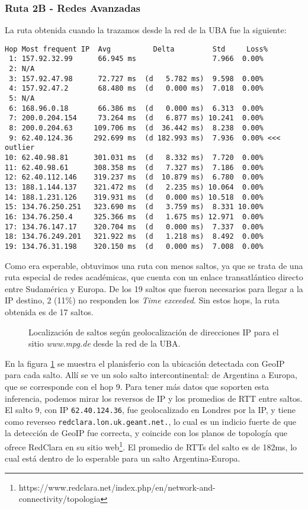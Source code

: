 \subsubsection{Ruta 2B - Redes Avanzadas}

La ruta obtenida cuando la trazamos desde la red de la UBA fue la siguiente:

\begin{Verbatim}[fontsize=\scriptsize]
Hop Most frequent IP  Avg          Delta         Std     Loss%
 1: 157.92.32.99      66.945 ms                  7.966  0.00% 
 2: N/A            
 3: 157.92.47.98      72.727 ms  (d   5.782 ms)  9.598  0.00% 
 4: 157.92.47.2       68.480 ms  (d   0.000 ms)  7.018  0.00% 
 5: N/A            
 6: 168.96.0.18       66.386 ms  (d   0.000 ms)  6.313  0.00% 
 7: 200.0.204.154     73.264 ms  (d   6.877 ms) 10.241  0.00% 
 8: 200.0.204.63     109.706 ms  (d  36.442 ms)  8.238  0.00% 
 9: 62.40.124.36     292.699 ms  (d 182.993 ms)  7.936  0.00% <<< outlier
10: 62.40.98.81      301.031 ms  (d   8.332 ms)  7.720  0.00% 
11: 62.40.98.61      308.358 ms  (d   7.327 ms)  7.186  0.00% 
12: 62.40.112.146    319.237 ms  (d  10.879 ms)  6.780  0.00% 
13: 188.1.144.137    321.472 ms  (d   2.235 ms) 10.064  0.00% 
14: 188.1.231.126    319.931 ms  (d   0.000 ms) 10.518  0.00% 
15: 134.76.250.251   323.690 ms  (d   3.759 ms)  8.331 10.00% 
16: 134.76.250.4     325.366 ms  (d   1.675 ms) 12.971  0.00% 
17: 134.76.147.17    320.704 ms  (d   0.000 ms)  7.337  0.00% 
18: 134.76.249.201   321.922 ms  (d   1.218 ms)  8.492  0.00% 
19: 134.76.31.198    320.150 ms  (d   0.000 ms)  7.008  0.00%
\end{Verbatim}

Como era esperable, obtuvimos una ruta con menos saltos, ya que se trata de una ruta especial de redes académicas, que cuenta con un enlace transatlántico directo entre Sudamérica y Europa.
De los 19 saltos que fueron necesarios para llegar a la IP destino, 2 (11\%) no responden los \emph{Time exceeded}. Sin estos hops, la ruta obtenida es de 17 saltos.

\begin{figure}[H]
    \caption{Localización de saltos según geolocalización de direcciones IP para
    el sitio \emph{www.mpg.de} desde la red de la UBA.}
    \label{res:esc2b:map}
\end{figure}

En la figura \ref{res:esc2b:map} se muestra el planisferio con la ubicación detectada con GeoIP para cada salto. Allí se ve un solo salto intercontinental: de Argentina a Europa, que se corresponde con el hop 9. Para tener más datos que soporten esta inferencia, podemos mirar los reversos de IP y los promedios de RTT entre saltos. El salto 9, con IP \texttt{62.40.124.36}, fue geolocalizado en Londres por la IP, y tiene como reverseo \texttt{redclara.lon.uk.geant.net.}, lo cual es un indicio fuerte de que la detección de GeoIP fue correcta, y coincide con los planos de topología que ofrece RedClara en su sitio web\footnote{https://www.redclara.net/index.php/en/network-and-connectivity/topologia}. El promedio de RTTs del salto es de 182ms, lo cual está dentro de lo esperable para un salto Argentina-Europa.

